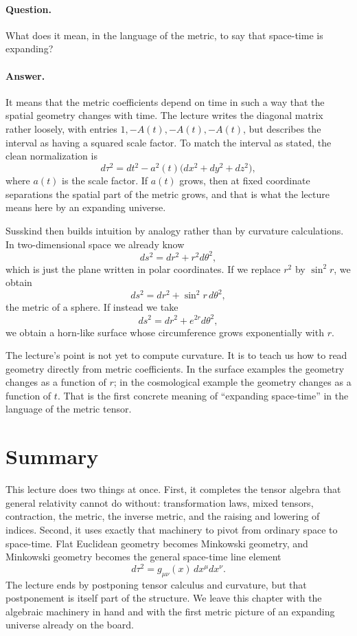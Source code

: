 \paragraph{Question.} What does it mean, in the language of the metric, to say that space-time is expanding?

\paragraph{Answer.} It means that the metric coefficients depend on time in such a way that the spatial geometry changes with time. The lecture writes the diagonal matrix rather loosely, with entries \(1,-A(t),-A(t),-A(t)\), but describes the interval as having a squared scale factor. To match the interval as stated, the clean normalization is
\begin{equation}
d\tau^2=dt^2-a^2(t)\bigl(dx^2+dy^2+dz^2\bigr),
\end{equation}
where \(a(t)\) is the scale factor. If \(a(t)\) grows, then at fixed coordinate separations the spatial part of the metric grows, and that is what the lecture means here by an expanding universe.

Susskind then builds intuition by analogy rather than by curvature calculations. In two-dimensional space we already know
\begin{equation}
ds^2=dr^2+r^2 d\theta^2,
\end{equation}
which is just the plane written in polar coordinates. If we replace \(r^2\) by \(\sin^2 r\), we obtain
\begin{equation}
ds^2=dr^2+\sin^2 r\,d\theta^2,
\end{equation}
the metric of a sphere. If instead we take
\begin{equation}
ds^2=dr^2+e^{2r}d\theta^2,
\end{equation}
we obtain a horn-like surface whose circumference grows exponentially with \(r\).

The lecture's point is not yet to compute curvature. It is to teach us how to read geometry directly from metric coefficients. In the surface examples the geometry changes as a function of \(r\); in the cosmological example the geometry changes as a function of \(t\). That is the first concrete meaning of ``expanding space-time'' in the language of the metric tensor.

\section{Summary}

This lecture does two things at once. First, it completes the tensor algebra that general relativity cannot do without: transformation laws, mixed tensors, contraction, the metric, the inverse metric, and the raising and lowering of indices. Second, it uses exactly that machinery to pivot from ordinary space to space-time. Flat Euclidean geometry becomes Minkowski geometry, and Minkowski geometry becomes the general space-time line element
\[
d\tau^2=g_{\mu\nu}(x)\,dx^\mu dx^\nu.
\]
The lecture ends by postponing tensor calculus and curvature, but that postponement is itself part of the structure. We leave this chapter with the algebraic machinery in hand and with the first metric picture of an expanding universe already on the board.